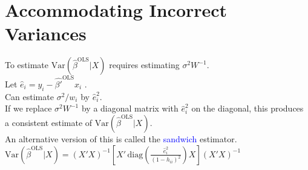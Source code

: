 \documentclass[14pt]{extarticle}
\begin{document}
\section*{Accommodating Incorrect Variances}
\noindent
To estimate \( \text{Var}(\hat{\beta}^{\text{OLS}} | X) \) requires estimating \( \sigma^2 W^{-1} \).\\
Let \( \hat{e}_i = y_i - \hat{\beta'}^{\text{OLS}}x_i \) \textcolor{red}{}.\\
Can estimate \( \sigma^2 / w_i \) by \( \hat{e}_i^2 \).\\
If we replace \( \sigma^2 W^{-1} \) by a diagonal matrix with \( \hat{e}_i^2 \) on the diagonal, this produces a consistent estimate of \( \text{Var}(\hat{\beta}^{\text{OLS}} | X) \).\\
An alternative version of this is called the \textcolor{blue}{sandwich} estimator.\\
$\text{Var}(\hat{\beta}^{\text{OLS}} | X) = (X'X)^{-1} [X' \, \text{diag} \left( \frac{\hat{e}_i^2}{(1 - h_{ii})^2} \right) X] (X'X)^{-1}$\\
\textcolor{red}{}
\end{document}
